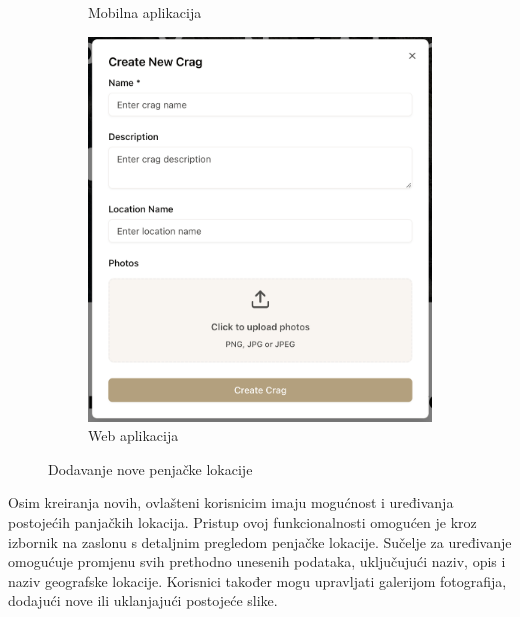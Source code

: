 \begin{figure}[H]
\begin{subfigure}[b]{0.31\textwidth}
        \caption{Mobilna aplikacija}
        \label{fig:dodavanje_lokacije_mob}
    \end{subfigure}
    \hfill
    \begin{subfigure}[b]{0.6\textwidth}
        \centering
        \includegraphics[width=\textwidth]{images/implementacija/web/editing-options/create-crag.png}
        \caption{Web aplikacija}
        \label{fig:dodavanje_lokacije_web}
    \end{subfigure}
    \caption{Dodavanje nove penjačke lokacije}
    \label{fig:dodavanje_lokacije}
\end{figure}

Osim kreiranja novih, ovlašteni korisnicim imaju mogućnost i uređivanja postojećih panjačkih lokacija. Pristup ovoj funkcionalnosti omogućen je kroz izbornik na zaslonu s detaljnim pregledom penjačke lokacije. Sučelje za uređivanje omogućuje promjenu svih prethodno unesenih podataka, uključujući naziv, opis i naziv geografske lokacije. Korisnici također mogu upravljati galerijom fotografija, dodajući nove ili uklanjajući postojeće slike. 

